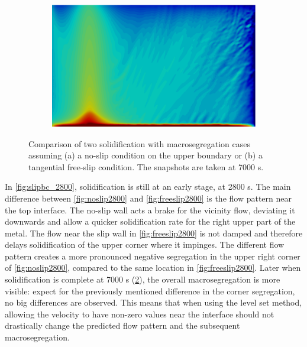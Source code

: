\begin{figure}[htbp]
\begin{subfigure}[t]{0.15\textwidth}
  \end{subfigure}
  \begin{subfigure}[t]{0.4\textwidth}
    \centering
  \includegraphics[width=\textwidth]{Chapter5/Graphics/2d/ref_7000s_sliptop.png}
  \caption{}
    \label{fig:freeslip7000}
  \end{subfigure}
\caption{Comparison of two solidification with macrosegregation cases assuming (a) a no-slip condition on the upper boundary 
or (b) a tangential free-slip condition. The snapshots are taken at 7000 s.}
\label{fig:slipbc_7000}
\end{figure}

In \cref{fig:slipbc_2800}, solidification is still at an early stage, at 2800 s. The main difference between \cref{fig:noslip2800} and 
\cref{fig:freeslip2800} is the flow pattern near the top interface. The no-slip wall acts a brake for the vicinity flow, 
deviating it downwards and allow a quicker solidification rate for the right upper part of the metal. The flow near the slip wall
in \cref{fig:freeslip2800} is not damped and therefore delays solidification of the upper corner where it impinges.
The different flow pattern creates a more pronounced negative segregation in the upper right corner of \cref{fig:noslip2800}, compared
to the same location in  \cref{fig:freeslip2800}. Later when solidification is complete at 7000 s (\cref{fig:slipbc_7000}), the overall
macrosegregation is more visible: expect for the previously mentioned difference in the corner segregation, no big differences are observed.
This means that when using the level set method, allowing the velocity to have non-zero values near the interface should not drastically  change the
predicted flow pattern and the subsequent macrosegregation.

